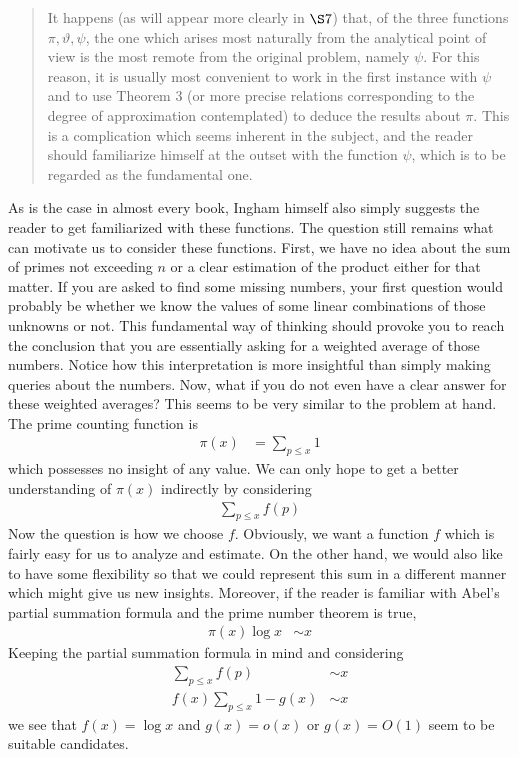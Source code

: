 \documentclass[elemannt.tex]{subfile}
\begin{document}
		\begin{quote}
			It happens (as will appear more clearly in $\S7$) that, of the three functions $\pi,\vartheta,\psi$, the one which arises most naturally from the analytical point of view is the most remote from the original problem, namely $\psi$. For this reason, it is usually most convenient to work in the first instance with $\psi$ and to use Theorem 3 (or more precise relations corresponding to the degree of approximation contemplated) to deduce the results about $\pi$. This is a complication which seems inherent in the subject, and the reader should familiarize himself at the outset with the function $\psi$, which is to be regarded as the fundamental one.
		\end{quote}
	As is the case in almost every book, Ingham himself also simply suggests the reader to get familiarized with these functions. The question still remains what can motivate us to consider these functions. First, we have no idea about the sum of primes not exceeding $n$ or a clear estimation of the product either for that matter. If you are asked to find some missing numbers, your first question would probably be whether we know the values of some linear combinations of those unknowns or not. This fundamental way of thinking should provoke you to reach the conclusion that you are essentially asking for a weighted average of those numbers. Notice how this interpretation is more insightful than simply making queries about the numbers. Now, what if you do not even have a clear answer for these weighted averages? This seems to be very similar to the problem at hand. The prime counting function is
		\begin{align*}
			\pi(x)
				& = \sum_{p\leq x}1
		\end{align*}
	which possesses no insight of any value. We can only hope to get a better understanding of $\pi(x)$ indirectly by considering
		\begin{align*}
			\sum_{p\leq x}f(p)
		\end{align*}
	Now the question is how we choose $f$. Obviously, we want a function $f$ which is fairly easy for us to analyze and estimate. On the other hand, we would also like to have some flexibility so that we could represent this sum in a different manner which might give us new insights. Moreover, if the reader is familiar with Abel's partial summation formula and the prime number theorem is true,
		\begin{align*}
			\pi(x)\log{x}
				& \sim x
		\end{align*}
	Keeping the partial summation formula in mind and considering
		\begin{align*}
			\sum_{p\leq x}f(p)
				& \sim x\\
			f(x)\sum_{p\leq x}1-g(x)
				& \sim x
		\end{align*}
	we see that $f(x)=\log{x}$ and $g(x)=o(x)$ or $g(x)=O(1)$ seem to be suitable candidates.
	
\end{document}
